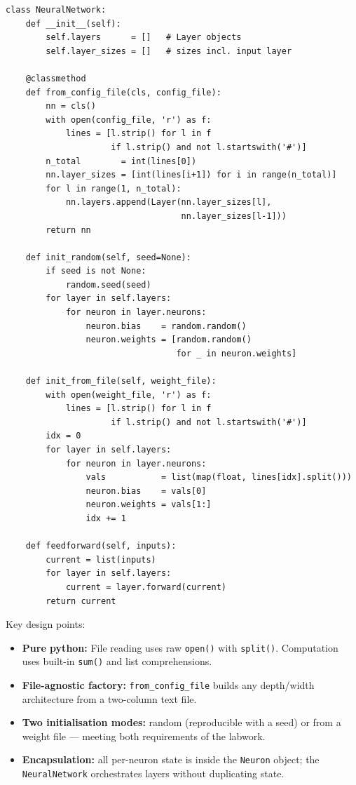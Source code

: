 \documentclass[12pt,a4paper]{article}
\begin{document}
\begin{lstlisting}[caption={NeuralNetwork class (key methods)}]
class NeuralNetwork:
    def __init__(self):
        self.layers      = []   # Layer objects
        self.layer_sizes = []   # sizes incl. input layer

    @classmethod
    def from_config_file(cls, config_file):
        nn = cls()
        with open(config_file, 'r') as f:
            lines = [l.strip() for l in f
                     if l.strip() and not l.startswith('#')]
        n_total        = int(lines[0])
        nn.layer_sizes = [int(lines[i+1]) for i in range(n_total)]
        for l in range(1, n_total):
            nn.layers.append(Layer(nn.layer_sizes[l],
                                   nn.layer_sizes[l-1]))
        return nn

    def init_random(self, seed=None):
        if seed is not None:
            random.seed(seed)
        for layer in self.layers:
            for neuron in layer.neurons:
                neuron.bias    = random.random()
                neuron.weights = [random.random()
                                  for _ in neuron.weights]

    def init_from_file(self, weight_file):
        with open(weight_file, 'r') as f:
            lines = [l.strip() for l in f
                     if l.strip() and not l.startswith('#')]
        idx = 0
        for layer in self.layers:
            for neuron in layer.neurons:
                vals           = list(map(float, lines[idx].split()))
                neuron.bias    = vals[0]
                neuron.weights = vals[1:]
                idx += 1

    def feedforward(self, inputs):
        current = list(inputs)
        for layer in self.layers:
            current = layer.forward(current)
        return current
\end{lstlisting}

Key design points:
\begin{itemize}
    \item \textbf{Pure python:} File reading uses raw
          \texttt{open()} with \texttt{split()}.
          Computation uses built-in \texttt{sum()} and list comprehensions.
    \item \textbf{File-agnostic factory:} \texttt{from\_config\_file} builds
          any depth/width architecture from a two-column text file.
    \item \textbf{Two initialisation modes:} random (reproducible with a seed)
          or from a weight file --- meeting both requirements of the labwork.
    \item \textbf{Encapsulation:} all per-neuron state is inside the
          \texttt{Neuron} object; the \texttt{NeuralNetwork} orchestrates
          layers without duplicating state.
\end{itemize}
\end{document}
